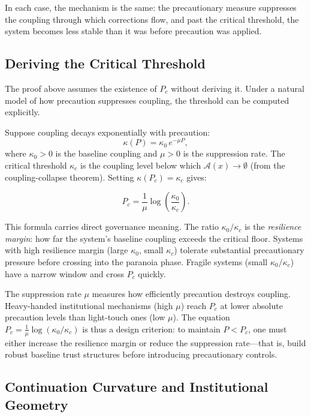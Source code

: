 \documentclass[11pt,a4paper]{article}
\theoremstyle{definition}
\theoremstyle{plain}
\begin{document}
In each case, the mechanism is the same: the precautionary measure suppresses the coupling through which corrections flow, and past the critical threshold, the system becomes less stable than it was before precaution was applied.

\subsection{Deriving the Critical Threshold}

The proof above assumes the existence of $P_c$ without deriving it. Under a natural model of how precaution suppresses coupling, the threshold can be computed explicitly.

Suppose coupling decays exponentially with precaution:
\begin{equation}
\kappa(P) = \kappa_0\, e^{-\mu P},
\end{equation}
where $\kappa_0 > 0$ is the baseline coupling and $\mu > 0$ is the suppression rate. The critical threshold $\kappa_c$ is the coupling level below which $\mathcal{A}(x) \to \emptyset$ (from the coupling-collapse theorem). Setting $\kappa(P_c) = \kappa_c$ gives:

\begin{equation}
P_c = \frac{1}{\mu}\log\!\left(\frac{\kappa_0}{\kappa_c}\right).
\end{equation}

This formula carries direct governance meaning. The ratio $\kappa_0/\kappa_c$ is the \emph{resilience margin}: how far the system's baseline coupling exceeds the critical floor. Systems with high resilience margin (large $\kappa_0$, small $\kappa_c$) tolerate substantial precautionary pressure before crossing into the paranoia phase. Fragile systems (small $\kappa_0/\kappa_c$) have a narrow window and cross $P_c$ quickly.

The suppression rate $\mu$ measures how efficiently precaution destroys coupling. Heavy-handed institutional mechanisms (high $\mu$) reach $P_c$ at lower absolute precaution levels than light-touch ones (low $\mu$). The equation $P_c = \frac{1}{\mu}\log(\kappa_0/\kappa_c)$ is thus a design criterion: to maintain $P < P_c$, one must either increase the resilience margin or reduce the suppression rate---that is, build robust baseline trust structures before introducing precautionary controls.

\subsection{Continuation Curvature and Institutional Geometry}
\end{document}
